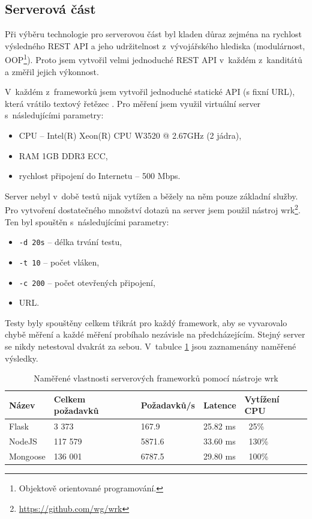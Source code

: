 \subsection{Serverová část}
\label{serv:fin}

Při výběru technologie pro serverovou část byl kladen důraz zejména na rychlost výsledného REST API a jeho udržitelnost z~vývojářského hlediska (modulárnost, OOP\footnote{Objektově orientované programování.}). Proto jsem vytvořil velmi jednoduché REST API v~každém z~kanditátů a změřil jejich výkonnost.

V~každém z~frameworků jsem vytvořil jednoduché statické API (s fixní URL), která vrátilo textový řetězec . Pro měření jsem využil virtuální server s~následujícími parametry:

\begin{itemize}
    \item CPU -- Intel(R) Xeon(R) CPU W3520  @ 2.67GHz (2 jádra),
    \item RAM 1GB DDR3 ECC,
    \item rychlost připojení do Internetu -- 500 Mbps.
\end{itemize}

Server nebyl v~době testů nijak vytížen a běžely na něm pouze základní služby. Pro vytvoření dostatečného množství dotazů na server jsem použil nástroj wrk\footnote{\url{https://github.com/wg/wrk}}. Ten byl spouštěn s~následujícími parametry:

\begin{itemize}
    \item \texttt{-d 20s} -- délka trvání testu,
    \item \texttt{-t 10} -- počet vláken,
    \item \texttt{-c 200} -- počet otevřených připojení,
    \item URL.
\end{itemize}

Testy byly spouštěny celkem třikrát pro každý framework, aby se vyvarovalo chybě měření a každé měření probíhalo nezávisle na předcházejícím. Stejný server se nikdy netestoval dvakrát za sebou. V~tabulce \ref{tab:server} jsou zaznamenány naměřené výsledky.

\begin{table}[ht]
\centering
\caption{Naměřené vlastnosti serverových frameworků pomocí nástroje wrk}
\label{tab:server}
\begin{tabular}{|l|l|l|l|l|}
\hline
    Název       & Celkem požadavků  & Požadavků/s   & Latence   & Vytížení CPU\\ \hline
    Flask       & 3 373             & 167.9         & 25.82 ms  & ~25\%\\
    NodeJS      & 117 579           & 5871.6        & 33.60 ms  & ~130\%\\
    Mongoose    & 136 001           & 6787.5        & 29.80 ms  & ~100\%\\
   \hline
\end{tabular}
\end{table}

